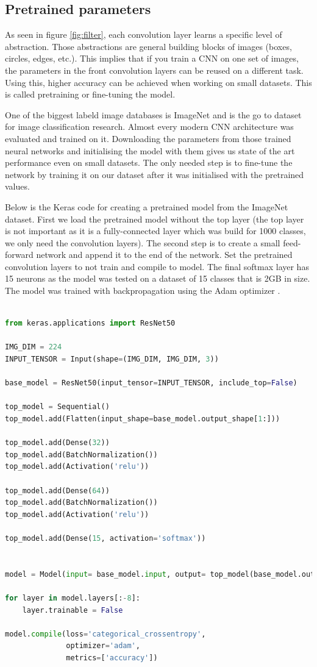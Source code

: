 \documentclass[times, utf8, diplomski]{fer}
\begin{document}
\subsection{Pretrained parameters}
\label{se:pretrained_parameters}
As seen in figure \ref{fig:filter}, each convolution layer learns a specific level of abstraction. Those abstractions are general building blocks of images (boxes, circles, edges, etc.). This implies that if you train a CNN on one set of images, the parameters in the front convolution layers can be reused on a different task. Using this, higher accuracy can be achieved when working on small datasets. This is called pretraining or fine-tuning the model.

One of the biggest labeld image databases is ImageNet and is the go to dataset for image classification research. Almost every modern CNN architecture was evaluated and trained on it. Downloading the parameters from those trained neural networks and initialising the model with them gives us state of the art performance even on small datasets. The only needed step is to fine-tune the network by training it on our dataset after it was initialised with the pretrained values.

Below is the Keras code for creating a pretrained model from the ImageNet dataset. First we load the pretrained model without the top layer (the top layer is not important as it is a fully-connected layer which was build for 1000 classes, we only need the convolution layers). The second step is to create a small feed-forward network and append it to the end of the network. Set the pretrained convolution layers to not train and compile to model. The final softmax layer has 15 neurons as the model was tested on a dataset of 15 classes that is 2GB in size. The model was trained with backpropagation using the Adam optimizer \citep{kingma_adam:_2014}.

\begin{lstlisting}[language=Python, caption=Creating a custom pretrained ResNet on the ImageNet dataset]

from keras.applications import ResNet50

IMG_DIM = 224
INPUT_TENSOR = Input(shape=(IMG_DIM, IMG_DIM, 3))

base_model = ResNet50(input_tensor=INPUT_TENSOR, include_top=False)

top_model = Sequential()
top_model.add(Flatten(input_shape=base_model.output_shape[1:]))

top_model.add(Dense(32))
top_model.add(BatchNormalization())
top_model.add(Activation('relu'))

top_model.add(Dense(64))
top_model.add(BatchNormalization())
top_model.add(Activation('relu'))

top_model.add(Dense(15, activation='softmax'))


model = Model(input= base_model.input, output= top_model(base_model.output))

for layer in model.layers[:-8]:
    layer.trainable = False
    
model.compile(loss='categorical_crossentropy',
              optimizer='adam',
              metrics=['accuracy'])
\end{lstlisting}
\end{document}
